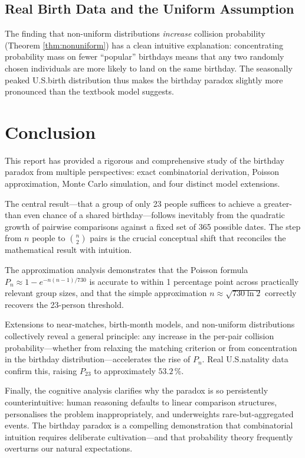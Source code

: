 \documentclass[12pt]{report}
\theoremstyle{definition}
\begin{document}
\section{Real Birth Data and the Uniform Assumption}

The finding that non-uniform distributions \emph{increase} collision probability (Theorem
\ref{thm:nonuniform}) has a clean intuitive explanation: concentrating probability mass
on fewer ``popular'' birthdays means that any two randomly chosen individuals are more
likely to land on the same birthday.  The seasonally peaked U.S.\@ birth distribution
thus makes the birthday paradox slightly more pronounced than the textbook model
suggests.

\chapter{Conclusion}

This report has provided a rigorous and comprehensive study of the birthday paradox
from multiple perspectives: exact combinatorial derivation, Poisson approximation,
Monte Carlo simulation, and four distinct model extensions.

The central result—that a group of only 23 people suffices to achieve a greater-than
even chance of a shared birthday—follows inevitably from the quadratic growth of
pairwise comparisons against a fixed set of 365 possible dates.  The step from $n$
people to $\binom{n}{2}$ pairs is the crucial conceptual shift that reconciles the
mathematical result with intuition.

The approximation analysis demonstrates that the Poisson formula
$P_n \approx 1 - e^{-n(n-1)/730}$ is accurate to within 1 percentage point across
practically relevant group sizes, and that the simple approximation $n \approx
\sqrt{730 \ln 2}$ correctly recovers the 23-person threshold.

Extensions to near-matches, birth-month models, and non-uniform distributions
collectively reveal a general principle: any increase in the per-pair collision
probability—whether from relaxing the matching criterion or from concentration in the
birthday distribution—accelerates the rise of $P_n$.  Real U.S.\@ natality data
confirm this, raising $P_{23}$ to approximately $53.2\,\%$.

Finally, the cognitive analysis clarifies why the paradox is so persistently
counterintuitive: human reasoning defaults to linear comparison structures, personalises
the problem inappropriately, and underweights rare-but-aggregated events.  The birthday
paradox is a compelling demonstration that combinatorial intuition requires deliberate
cultivation—and that probability theory frequently overturns our natural expectations.
\end{document}
